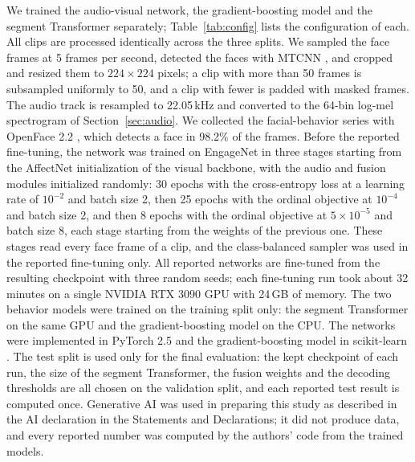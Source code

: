 \documentclass[pdflatex,iicol,sn-basic]{sn-jnl}
\begin{document}
We trained the audio-visual network, the gradient-boosting model and the segment Transformer separately; Table~\ref{tab:config} lists the configuration of each. All clips are processed identically across the three splits. We sampled the face frames at 5 frames per second, detected the faces with MTCNN \citep{zhang2016mtcnn}, and cropped and resized them to $224 \times 224$ pixels; a clip with more than 50 frames is subsampled uniformly to 50, and a clip with fewer is padded with masked frames. The audio track is resampled to 22.05\,kHz and converted to the 64-bin log-mel spectrogram of Section~\ref{sec:audio}. We collected the facial-behavior series with OpenFace 2.2 \citep{baltrusaitis2018openface}, which detects a face in 98.2\% of the frames. Before the reported fine-tuning, the network was trained on EngageNet in three stages starting from the AffectNet initialization of the visual backbone, with the audio and fusion modules initialized randomly: 30 epochs with the cross-entropy loss at a learning rate of $10^{-2}$ and batch size 2, then 25 epochs with the ordinal objective at $10^{-4}$ and batch size 2, and then 8 epochs with the ordinal objective at $5 \times 10^{-5}$ and batch size 8, each stage starting from the weights of the previous one. These stages read every face frame of a clip, and the class-balanced sampler was used in the reported fine-tuning only.
All reported networks are fine-tuned from the resulting checkpoint with three random seeds; each fine-tuning run took about 32 minutes on a single NVIDIA RTX 3090 GPU with 24\,GB of memory. The two behavior models were trained on the training split only: the segment Transformer on the same GPU and the gradient-boosting model on the CPU. The networks were implemented in PyTorch 2.5 and the gradient-boosting model in scikit-learn \citep{pedregosa2011sklearn}. The test split is used only for the final evaluation: the kept checkpoint of each run, the size of the segment Transformer, the fusion weights and the decoding thresholds are all chosen on the validation split, and each reported test result is computed once. Generative AI was used in preparing this study as described in the AI declaration in the Statements and Declarations; it did not produce data, and every reported number was computed by the authors' code from the trained models.
\end{document}
